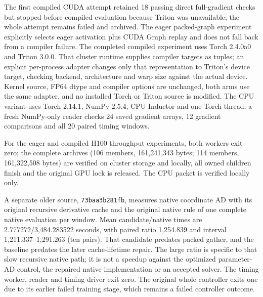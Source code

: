 \documentclass[11pt]{article}
\begin{document}
The first compiled CUDA attempt retained 18 passing direct full-gradient
checks but stopped before compiled evaluation because Triton was
unavailable; the whole attempt remains failed and archived. The eager
packed-graph experiment explicitly selects eager activation plus CUDA Graph
replay and does not fall back from a compiler failure. The completed
compiled experiment uses Torch 2.4.0a0 and Triton 3.0.0. That cluster
runtime supplies compiler targets as tuples; an explicit per-process
adapter changes only that representation to Triton's device target,
checking backend, architecture and warp size against the actual device.
Kernel source, FP64 dtype and compiler options are unchanged, both arms use
the same adapter, and no installed Torch or Triton source is modified. The
CPU variant uses Torch 2.14.1, NumPy 2.5.4, CPU Inductor and one Torch
thread; a fresh NumPy-only reader checks 24 saved gradient arrays, 12
gradient comparisons and all 20 paired timing windows.

For the eager and compiled H100 throughput experiments, both workers exit
zero; the complete archives (106 members, 161,241,343 bytes; 114 members,
161,322,508 bytes) are verified on cluster storage and locally, all owned
children finish and the original GPU lock is released. The CPU packet is
verified locally only.

A separate older source, \texttt{73baa3b281fb}, measures native coordinate
AD with its original recursive derivative cache and the original native
rule of one complete native evaluation per window. Mean candidate/native
times are 2.777272/3,484.283522 seconds, with paired ratio 1,254.839 and
interval 1,211.337--1,291.263 (ten pairs). That candidate predates packed
gather, and the baseline predates the later cache-lifetime repair. The
large ratio is specific to that slow recursive native path; it is not a
speedup against the optimized parameter-AD control, the repaired native
implementation or an accepted solver. The timing worker, reader and timing
driver exit zero. The original whole controller exits one due to its
earlier failed training stage, which remains a failed controller outcome.
\end{document}
